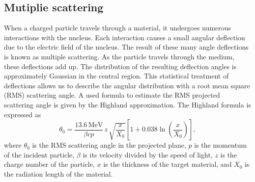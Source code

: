\documentclass[sn-mathphys-num,iicol]{sn-jnl}
\theoremstyle{thmstyleone}
\theoremstyle{thmstyletwo}
\theoremstyle{thmstylethree}
\begin{document}
\subsection{Mutiplie scattering}
When a charged particle travels through a material, it undergoes numerous interactions with the nucleus. Each interaction causes a small angular deflection due to the electric field of the nucleus. The result of these many angle deflections is known as multiple scattering. As the particle travels through the medium, these deflections add up. The distribution of the resulting deflection angles is approximately Gaussian in the central region. This statistical treatment of deflections allows us to describe the angular distribution with a root mean square (RMS) scattering angle.
A used formula to estimate the RMS projected scattering angle is given by the Highland approximation. The Highland formula is expressed as
\begin{equation}\label{eq:Highland}
    \theta_0 = \frac{13.6\,\text{MeV}}{\beta cp} \, z \, \sqrt{\frac{x}{X_0}} \left[1 + 0.038 \ln\left(\frac{x}{X_0}\right)\right],
\end{equation}
where $\theta_0$ is the RMS scattering angle in the projected plane, $p$ is the momentum of the incident particle, $\beta$ is its velocity divided by the speed of light, $z$ is the charge number of the particle, $x$ is the thickness of the target material, and $X_0$ is the radiation length of the material.
\end{document}

